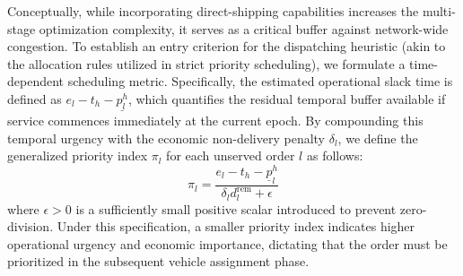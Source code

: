 \documentclass[10pt, reqno]{amsart}
\begin{document}
Conceptually, while incorporating direct-shipping capabilities increases the multi-stage optimization complexity, it serves as a critical buffer against network-wide congestion. To establish an entry criterion for the dispatching heuristic (akin to the allocation rules utilized in strict priority scheduling), we formulate a time-dependent scheduling metric. Specifically, the estimated operational slack time is defined as $e_l - t_h - \underline{p_{l}^h}$, which quantifies the residual temporal buffer available if service commences immediately at the current epoch. By compounding this temporal urgency with the economic non-delivery penalty $\delta_l$, we define the generalized priority index $\pi_l$ for each unserved order $l$ as follows:
\begin{equation}
\label{eq:pri_ind}
\pi_l = \frac{e_l - t_h - \underline{p}_l^h}{\delta_l d_l^{\text{rem}} + \epsilon}
\end{equation}
where $\epsilon > 0$ is a sufficiently small positive scalar introduced to prevent zero-division. Under this specification, a smaller priority index indicates higher operational urgency and economic importance, dictating that the order must be prioritized in the subsequent vehicle assignment phase.
\end{document}
